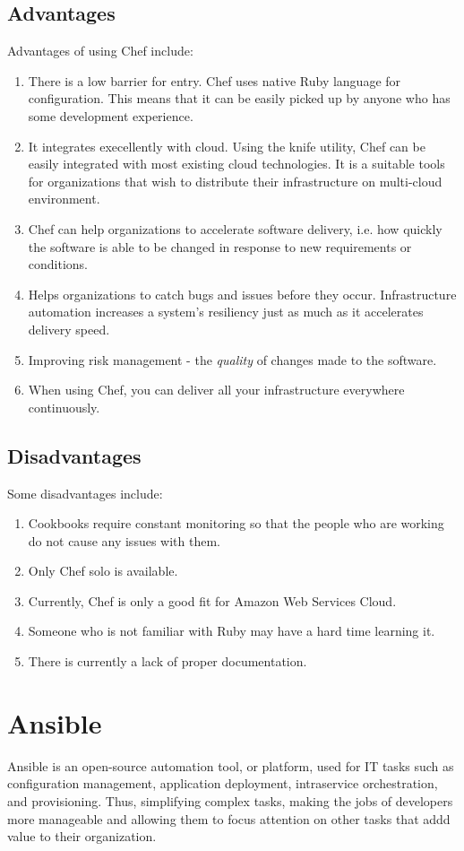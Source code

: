 \documentclass[a4paper, 12pt]{article}
\begin{document}
\subsection{Advantages}
Advantages of using Chef include:
\begin{enumerate}
\item
There is a low barrier for entry. Chef uses native Ruby language for configuration. This means that it can be easily picked up by anyone who has some development experience.
\item
It integrates execellently with cloud. Using the knife utility, Chef can be easily integrated with most existing cloud technologies. It is a suitable tools for organizations that wish to distribute their infrastructure on multi-cloud environment. 
\item
Chef can help organizations to accelerate software delivery, i.e. how quickly the software is able to be changed in response to new requirements or conditions. 
\item
Helps organizations to catch bugs and issues before they occur. Infrastructure automation increases a system's resiliency just as much as it accelerates delivery speed. 
\item
Improving risk management - the \textit{quality} of changes made to the software.
\item
When using Chef, you can deliver all your infrastructure everywhere continuously.
\end{enumerate}
\subsection{Disadvantages}
Some disadvantages include:
\begin{enumerate}
\item
Cookbooks require constant monitoring so that the people who are working do not cause any issues with them. 
\item
Only Chef solo is available. 
\item
Currently, Chef is only a good fit for Amazon Web Services Cloud. 
\item
Someone who is not familiar with Ruby may have a hard time learning it.
\item
There is currently a lack of proper documentation.
\end{enumerate}

\newpage
\section{Ansible}
Ansible is an open-source automation tool, or platform, used for IT tasks such as configuration management, application deployment, intraservice orchestration, and provisioning. Thus, simplifying complex tasks, making the jobs of developers more manageable and allowing them to focus attention on other tasks that addd value to their organization. 
\end{document}
